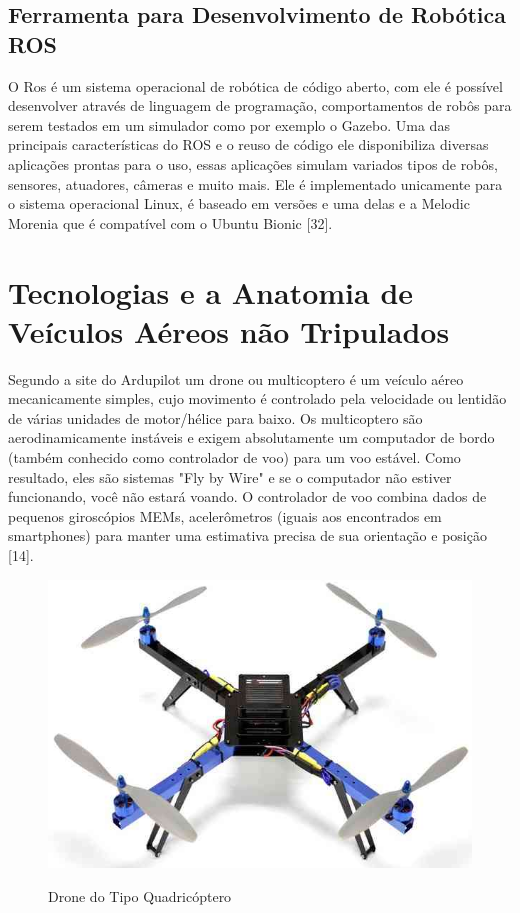 \subsection{Ferramenta para Desenvolvimento de Robótica ROS}
O Ros é um sistema operacional de robótica de código aberto, com ele é possível desenvolver através de linguagem de programação, comportamentos de robôs para serem testados em um simulador como por exemplo o Gazebo. Uma das principais características do ROS e o reuso de código ele disponibiliza diversas aplicações prontas para o uso, essas aplicações simulam variados tipos de robôs, sensores, atuadores, câmeras e muito mais. Ele é implementado unicamente para o sistema operacional Linux, é baseado em versões e uma delas e a Melodic Morenia que é compatível com o Ubuntu Bionic [32].
\section{Tecnologias e a Anatomia de Veículos Aéreos não Tripulados}
Segundo a site do Ardupilot um drone ou multicoptero é um veículo aéreo mecanicamente simples, cujo movimento é controlado pela velocidade ou lentidão de várias unidades de motor/hélice para baixo.
Os multicoptero são aerodinamicamente instáveis e exigem absolutamente um computador de bordo (também conhecido como controlador de voo) para um voo estável. Como resultado, eles são sistemas "Fly by Wire" e se o computador não estiver funcionando, você não estará voando. O controlador de voo combina dados de pequenos giroscópios MEMs, acelerômetros (iguais aos encontrados em smartphones) para manter uma estimativa precisa de sua orientação e posição [14].

\begin{figure}[htpb]
  \centering
  \caption{Drone do Tipo Quadricóptero}
  \includegraphics[scale=.5]{figs/drone.jpg}
  \label{fig:quad}
\end{figure}

